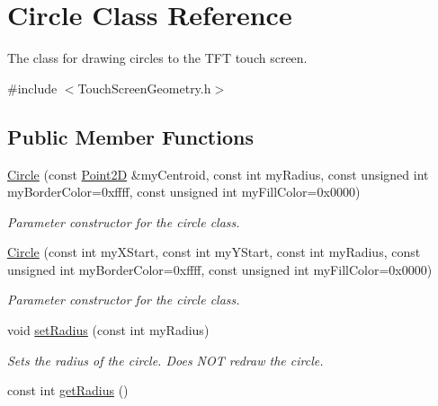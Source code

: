 \hypertarget{class_circle}{\section{Circle Class Reference}
\label{class_circle}
}


The class for drawing circles to the T\+F\+T touch screen.  




{\ttfamily \#include $<$Touch\+Screen\+Geometry.\+h$>$}

\subsection*{Public Member Functions}
\begin{DoxyCompactItemize}
\item 
\hyperlink{class_circle_a88890d82b0634ae7c1f7395d0586d2bd}{Circle} (const \hyperlink{class_point2_d}{Point2\+D} \&my\+Centroid, const int my\+Radius, const unsigned int my\+Border\+Color=0xffff, const unsigned int my\+Fill\+Color=0x0000)
\begin{DoxyCompactList}\small\item\em Parameter constructor for the circle class. \end{DoxyCompactList}\item 
\hyperlink{class_circle_ab7a7dd06732d8519b3a2b14266952858}{Circle} (const int my\+X\+Start, const int my\+Y\+Start, const int my\+Radius, const unsigned int my\+Border\+Color=0xffff, const unsigned int my\+Fill\+Color=0x0000)
\begin{DoxyCompactList}\small\item\em Parameter constructor for the circle class. \end{DoxyCompactList}\item 
void \hyperlink{class_circle_a2f81a4869baba24481a710bbd266c395}{set\+Radius} (const int my\+Radius)
\begin{DoxyCompactList}\small\item\em Sets the radius of the circle. Does N\+O\+T redraw the circle. \end{DoxyCompactList}\item 
\hypertarget{class_circle_a4fee50b67efc5b5e188e92379140bb42}{const int \hyperlink{class_circle_a4fee50b67efc5b5e188e92379140bb42}{get\+Radius} ()}\label{class_circle_a4fee50b67efc5b5e188e92379140bb42}


\end{DoxyCompactItemize}
